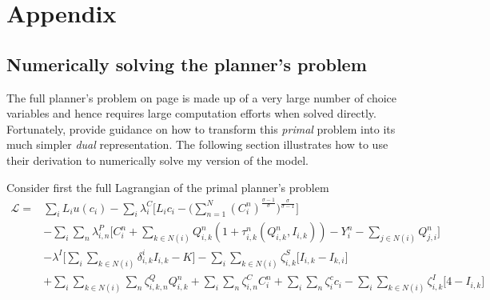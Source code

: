 \documentclass[11pt, oneside]{article}   	%
\begin{document}
  \section*{Appendix}

  \subsection{Numerically solving the planner's problem}
  \label{chapter:APP:math}


The full planner's problem on page \pageref{planner_problem} is made up of a very large number of choice variables and hence requires large computation efforts when solved directly. Fortunately, \cite{fajgelbaum_optimal_2017} provide guidance on how to transform this \emph{primal} problem into its much simpler \emph{dual} representation. The following section illustrates how to use their derivation to numerically solve my version of the model.

Consider first the full Lagrangian of the primal planner's problem
\begin{equation}
  \begin{aligned}
    \mathcal{L} ={} & \sum_{i}^{} L_{i}u(c_{i}) - \sum_{i}^{}\lambda^{C}_{i}\bigg[L_{i}c_{i} - \bigg( \sum_{n=1}^{N} (C_{i}^{n})^{\frac{\sigma-1}{\sigma}}\bigg)^{\frac{\sigma}{\sigma-1}} \bigg] \\
  & - \sum_{i}^{}\sum_{n}^{}\lambda^{P}_{i,n}\bigg[ C_{i}^{n} + \sum_{k\in N(i)}^{}Q_{i,k}^{n}(1+\tau_{i,k}^{n}(Q_{i,k}^{n}, I_{i,k})) - Y_{i}^{n} - \sum_{j\in N(i)}^{}Q_{j,i}^{n} \bigg] \\
  & - \lambda^{I}\bigg[\sum_{i}^{}\sum_{k\in N(i)}^{}\delta^{i}_{i,k}I_{i,k} - K \bigg] - \sum_{i}^{}\sum_{k \in N(i)}^{}\zeta^{S}_{i,k}\bigg[ I_{i,k} - I_{k,i} \bigg] \\
  & + \sum_{i}^{}\sum_{k \in N(i)}^{}\sum_{n}^{} \zeta^{Q}_{i,k,n}Q_{i,k}^{n} + \sum_{i}^{}\sum_{n}^{} \zeta^{C}_{i,n}C_{i}^{n} + \sum_{i}^{}\sum_{n}^{} \zeta^{c}_{i}c_{i} - \sum_{i}^{}\sum_{k \in N(i)}^{} \zeta^{I}_{i,k}\bigg[4-I_{i,k}\bigg]
  \end{aligned}
\end{equation}
\end{document}

